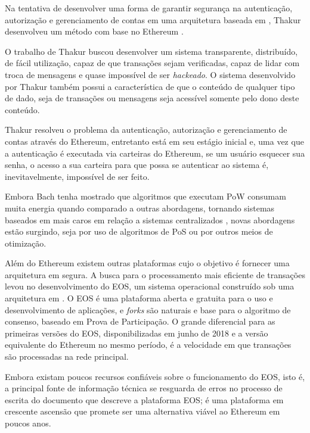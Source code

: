 \documentclass[tcc,capa]{texufpel}
\begin{document}
    Na tentativa de desenvolver uma forma de garantir segurança na autenticação, autorização e gerenciamento de contas em uma arquitetura baseada em \bchain, Thakur desenvolveu um método com base no Ethereum \cite{thakur2017authentication}.
    
    O trabalho de Thakur buscou desenvolver um sistema transparente, distribuído, de fácil utilização, capaz de que transações sejam verificadas, capaz de lidar com troca de mensagens e quase impossível de ser \textit{hackeado}. O sistema desenvolvido por Thakur também possui a característica de que o conteúdo de qualquer tipo de dado, seja de transações ou mensagens seja acessível somente pelo dono deste conteúdo.
    
    Thakur resolveu o problema da autenticação, autorização e gerenciamento de contas através do Ethereum, entretanto está em seu estágio inicial e, uma vez que a autenticação é executada via carteiras do Ethereum, se um usuário esquecer sua senha, o acesso a sua carteira para que possa se autenticar ao sistema é, inevitavelmente, impossível de ser feito.
    
    Embora Bach tenha mostrado que algoritmos que executam PoW consumam muita energia quando comparado a outras abordagens, tornando sistemas baseados em \bchain mais caros em relação a sistemas centralizados \cite{bach2018comparative}, novas abordagens estão surgindo, seja por uso de algoritmos de PoS ou por outros meios de otimização.
    
    Além do Ethereum existem outras plataformas cujo o objetivo é fornecer uma arquitetura em \bchain segura. A busca para o processamento mais eficiente de transações levou no desenvolvimento do EOS, um sistema operacional construído sob uma arquitetura em \bchain \cite{eos2018}. O EOS é uma plataforma aberta e gratuita para o uso e desenvolvimento de aplicações, e \textit{forks} são naturais e base para o algoritmo de consenso, baseado em Prova de Participação. O grande diferencial para as primeiras versões do EOS, disponibilizadas em junho de 2018 e a versão equivalente do Ethereum no mesmo período, é a velocidade em que transações são processadas na rede principal.
    
    Embora existam poucos recursos confiáveis sobre o funcionamento do EOS, isto é, a principal fonte de informação técnica se resguarda de erros no processo de escrita do documento que descreve a plataforma EOS; é uma plataforma em crescente ascensão que promete ser uma alternativa viável ao Ethereum em poucos anos.
    
\end{document}
